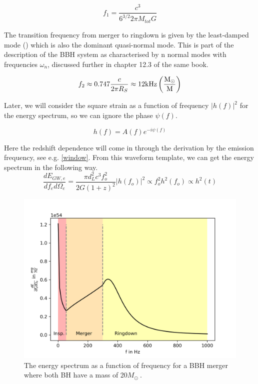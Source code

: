 \begin{equation}
    f_1 = \frac{c^3}{6^{3/2}2\pi M_{tot} G}
\end{equation}

The transition frequency from merger to ringdown is given by the least-damped mode (\cite{maggiore_gravitational_2008}) which is also the dominant quasi-normal mode. This is part of the description of the BBH system as characterised by n normal modes with frequencies $\omega_n$, discussed further in chapter 12.3 of the same book.

\begin{equation}
    f_2 \approx 0.747 \frac{c}{2\pi R_S} \approx 12 \rm{kHz} \left( \frac{M_\odot}{M}\right)
\end{equation}

Later, we will consider the square strain as a function of frequency $|h(f)|^2$ for the energy spectrum, so we can ignore the phase $\psi(f)$.

\begin{equation}
    h(f)=A(f)e^{-i\psi(f)}
\end{equation}

Here the redshift dependence will come in through the derivation by the emission 
frequency, see e.g. \ref{window}. From this waveform template, we can get the energy 
spectrum in the following way.
\begin{equation}
    \frac{dE_{GW,e}}{df_e d\Omega_e} = \frac{\pi d_L^2 c^3f_o^2}{2G(1+z)^2} | h(f_o)| ^2 \propto f_o^2h^2(f_o) \propto h^2(t)
\end{equation}

\begin{figure}
    \centering
    \includegraphics[width=1\linewidth]{Images/dE_df_of_f.png}
    \caption{The energy spectrum as a function of frequency for a BBH merger where both BH have a mass of 20$M_\odot\ $. }
    \label{dE_df_f}
\end{figure} 


